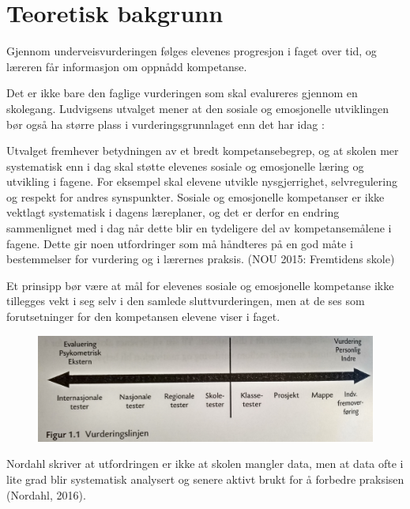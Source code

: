 \documentclass[main.tex]{subfiles}
\begin{document}
\section*{Teoretisk bakgrunn}
Gjennom underveisvurderingen følges elevenes progresjon
i faget over tid, og læreren får informasjon
om oppnådd kompetanse.

Det er ikke bare den faglige vurderingen som skal evalureres gjennom en skolegang. Ludvigsens utvalget mener
at den sosiale og emosjonelle utviklingen bør også ha større plass i vurderingsgrunnlaget enn det har idag :
\begin{displayquote}
Utvalget fremhever betydningen av et bredt kompetansebegrep,
og at skolen mer systematisk enn
i dag skal støtte elevenes sosiale og emosjonelle
læring og utvikling i fagene. For eksempel skal
elevene utvikle nysgjerrighet, selvregulering og
respekt for andres synspunkter. Sosiale og emosjonelle
kompetanser er ikke vektlagt systematisk
i dagens læreplaner, og det er derfor en endring
sammenlignet med i dag når dette blir en tydeligere
del av kompetansemålene i fagene. Dette
gir noen utfordringer som må håndteres på en
god måte i bestemmelser for vurdering og i lærernes
praksis. (NOU 2015: Fremtidens skole)
\end{displayquote}

Et prinsipp bør være at mål for elevenes sosiale
og emosjonelle kompetanse ikke tillegges vekt
i seg selv i den samlede sluttvurderingen, men at
de ses som forutsetninger for den kompetansen
elevene viser i faget.

\begin{figure}[h!]
\includegraphics[scale = 0.1]{../figures/vurderingslinjen.png}
\end{figure}

Nordahl skriver at utfordringen er ikke at skolen mangler data, men at data ofte i lite grad blir
systematisk analysert og senere aktivt brukt for å forbedre praksisen (Nordahl, 2016).
\end{document}
